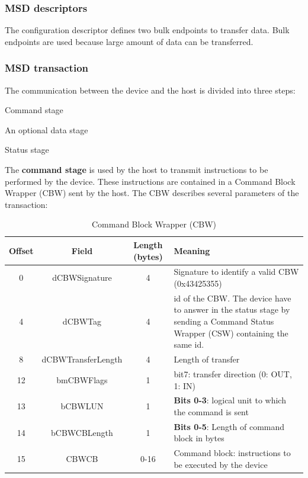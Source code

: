 \documentclass[pdftex,10pt,a4paper]{report}
\newenvironment{packed_item}{
\begin{itemize}
  \setlength{\itemsep}{1pt}
  \setlength{\parskip}{0pt}
  \setlength{\parsep}{0pt}
}{\end{itemize}}
\begin{document}
\subsubsection{MSD descriptors}
The configuration descriptor defines two bulk endpoints to transfer data. Bulk endpoints are used because large amount of data can be transferred.


\subsubsection{MSD transaction}
The communication between the device and the host is divided into three steps:
\begin{packed_item}
	\item Command stage
	\item An optional data stage
	\item Status stage
\end{packed_item}

The \textbf{command stage} is used by the host to transmit instructions to be performed by the device. These instructions are contained in a Command Block Wrapper (CBW) sent by the host. The CBW describes several parameters of the transaction:

\begin{table}[h!]
\centering
\begin{tabular}{|c|c|c| >{\arraybackslash}m{9cm} |}
\hline

Offset & Field & Length (bytes) & Meaning \\ \hline
0 & dCBWSignature & 4 & Signature to identify a valid CBW (0x43425355) \\ \hline
4 & dCBWTag & 4 &  id of the CBW. The device have to answer in the status stage by sending a Command Status Wrapper (CSW) containing the same id. \\ \hline
8 & dCBWTransferLength & 4 & Length of transfer \\ \hline
12 & bmCBWFlags & 1 & bit7: transfer direction (0: OUT, 1: IN) \\ \hline
13 & bCBWLUN & 1 & \textbf{Bits 0-3}: logical unit to which the command is sent \\ \hline
14 & bCBWCBLength & 1 & \textbf{Bits 0-5}: Length of command block in bytes \\ \hline
15 & CBWCB & 0-16 & Command block: instructions to be executed by the device \\ \hline

\end{tabular}
\caption{Command Block Wrapper (CBW)}
\label{Command Block Wrapper (CBW)}
\end{table}
\end{document}
